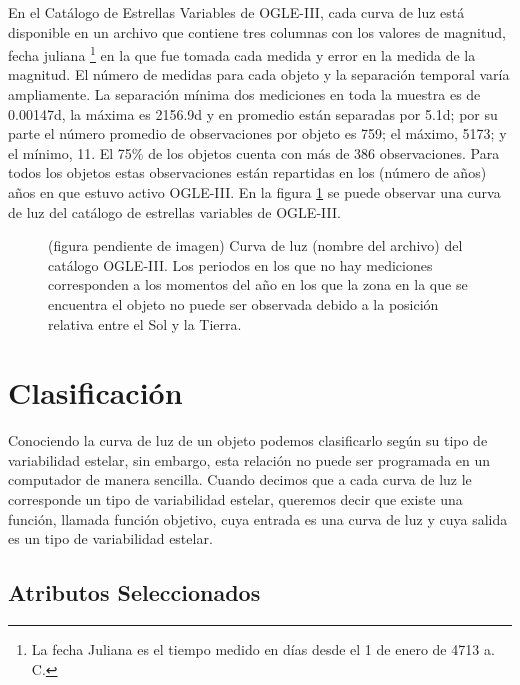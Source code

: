 \documentclass[letterpaper,12pt]{book}
\begin{document}
En el Catálogo de Estrellas Variables de OGLE-III, cada curva de luz está disponible en un archivo que contiene tres columnas con los valores de magnitud, fecha juliana \footnote{La fecha Juliana es el tiempo medido en días desde el 1 de enero de 4713 a. C.} en la que fue tomada cada medida y error en la medida de la magnitud. El número de medidas para cada objeto y la separación temporal varía ampliamente. La separación mínima dos mediciones en toda la muestra es de 0.00147d, la máxima es 2156.9d y en promedio están separadas por 5.1d; por su parte el número promedio de observaciones por objeto es 759; el máximo, 5173; y el mínimo,  11. El 75\% de los objetos cuenta con más de 386 observaciones. Para todos los objetos estas observaciones están repartidas en los (número de años) años en que estuvo activo OGLE-III. En la figura \ref{fig:curvaDeLuz} se puede observar una curva de luz del catálogo de estrellas variables de OGLE-III.    

\begin{figure}
  \label{fig:curvaDeLuz}
  \caption{(figura pendiente de imagen) Curva de luz (nombre del archivo) del catálogo OGLE-III. Los periodos en los que no hay mediciones corresponden a los momentos del año en los que la zona en la que se encuentra el objeto no puede ser observada debido a la posición relativa entre el Sol y la Tierra.}
\end{figure}

\chapter{Clasificación}\label{cap:clasificacion}

Conociendo la curva de luz de un objeto podemos clasificarlo según su tipo de variabilidad estelar, sin embargo, esta relación no puede ser programada en un computador de manera sencilla. Cuando decimos que a cada curva de luz le corresponde un tipo de variabilidad estelar, queremos decir que existe una función, llamada función objetivo, cuya entrada es una curva de luz y cuya salida es un tipo de variabilidad estelar. 




\section{Atributos Seleccionados \label{sec:atributos}}
\end{document}
